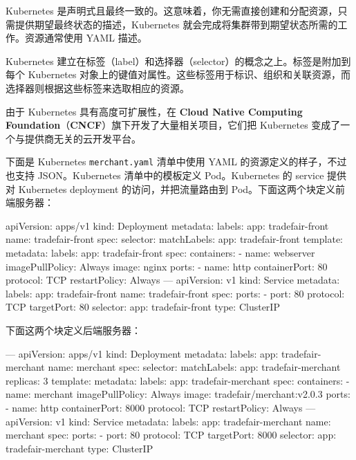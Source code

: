 Kubernetes 是声明式且最终一致的。这意味着，你无需直接创建和分配资源，只需提供期望最终状态的描述，Kubernetes 就会完成将集群带到期望状态所需的工作。资源通常使用 YAML 描述。

Kubernetes 建立在标签（label）和选择器（selector）的概念之上。标签是附加到每个 Kubernetes 对象上的键值对属性。这些标签用于标识、组织和关联资源，而选择器则根据这些标签来选取相应的资源。

\label{idx:1807}
由于 Kubernetes 具有高度可扩展性，在 \textbf{Cloud Native Computing Foundation}（\textbf{CNCF}）旗下开发了大量相关项目，它们把 Kubernetes 变成了一个与提供商无关的云开发平台。

下面是 Kubernetes \texttt{merchant.\allowbreak{}yaml} 清单中使用 YAML 的资源定义的样子，不过也支持 JSON。Kubernetes 清单中的模板定义 Pod。Kubernetes 的 service 提供对 Kubernetes deployment 的访问，并把流量路由到 Pod。下面这两个块定义前端服务器：

\begin{codebox}[yaml]
apiVersion: apps/v1
kind: Deployment
metadata:
  labels:
    app: tradefair-front
  name: tradefair-front
spec:
  selector:
    matchLabels:
      app: tradefair-front
  template:
    metadata:
      labels:
        app: tradefair-front
    spec:
      containers:
        - name: webserver
          imagePullPolicy: Always
          image: nginx
          ports:
            - name: http
              containerPort: 80
              protocol: TCP
      restartPolicy: Always
---
apiVersion: v1
kind: Service
metadata:
  labels:
    app: tradefair-front
  name: tradefair-front
spec:
  ports:
    - port: 80
      protocol: TCP
      targetPort: 80
  selector:
    app: tradefair-front
  type: ClusterIP
\end{codebox}

\label{idx:1808}
下面这两个块定义后端服务器：

\begin{codebox}[yaml]
---
apiVersion: apps/v1
kind: Deployment
metadata:
  labels:
    app: tradefair-merchant
  name: merchant
spec:
  selector:
    matchLabels:
      app: tradefair-merchant
  replicas: 3
  template:
    metadata:
      labels:
        app: tradefair-merchant
    spec:
      containers:
        - name: merchant
          imagePullPolicy: Always
          image: tradefair/merchant:v2.0.3
          ports:
            - name: http
              containerPort: 8000
              protocol: TCP
      restartPolicy: Always
---
apiVersion: v1
kind: Service
metadata:
  labels:
    app: tradefair-merchant
  name: merchant
spec:
  ports:
    - port: 80
      protocol: TCP
      targetPort: 8000
  selector:
    app: tradefair-merchant
    type: ClusterIP
\end{codebox}


